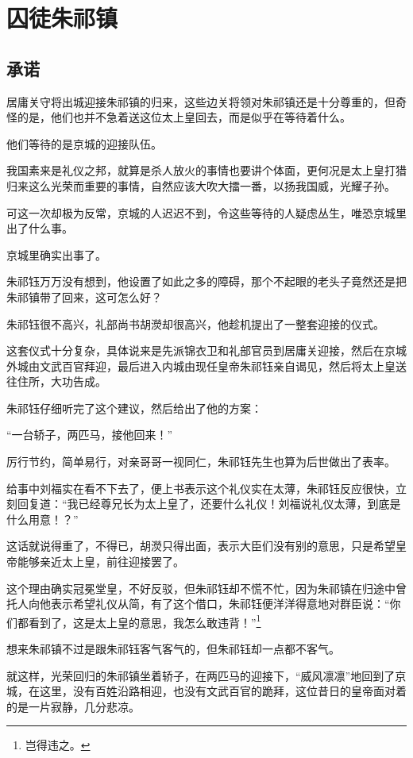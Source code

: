 \section{囚徒朱祁镇}
\ifnum{}
	\begin{multicols}{\theparacolNo}
\fi
\subsection{承诺}
居庸关守将出城迎接朱祁镇的归来，这些边关将领对朱祁镇还是十分尊重的，但奇怪的是，他们也并不急着送这位太上皇回去，而是似乎在等待着什么。

他们等待的是京城的迎接队伍。

我国素来是礼仪之邦，就算是杀人放火的事情也要讲个体面，更何况是太上皇打猎归来这么光荣而重要的事情，自然应该大吹大擂一番，以扬我国威，光耀子孙。

可这一次却极为反常，京城的人迟迟不到，令这些等待的人疑虑丛生，唯恐京城里出了什么事。

京城里确实出事了。

朱祁钰万万没有想到，他设置了如此之多的障碍，那个不起眼的老头子竟然还是把朱祁镇带了回来，这可怎么好？

朱祁钰很不高兴，礼部尚书胡濙却很高兴，他趁机提出了一整套迎接的仪式。

这套仪式十分复杂，具体说来是先派锦衣卫和礼部官员到居庸关迎接，然后在京城外城由文武百官拜迎，最后进入内城由现任皇帝朱祁钰亲自谒见，然后将太上皇送往住所，大功告成。

朱祁钰仔细听完了这个建议，然后给出了他的方案：

“一台轿子，两匹马，接他回来！”

厉行节约，简单易行，对亲哥哥一视同仁，朱祁钰先生也算为后世做出了表率。

给事中刘福实在看不下去了，便上书表示这个礼仪实在太薄，朱祁钰反应很快，立刻回复道：“我已经尊兄长为太上皇了，还要什么礼仪！刘福说礼仪太薄，到底是什么用意！？”

这话就说得重了，不得已，胡濙只得出面，表示大臣们没有别的意思，只是希望皇帝能够亲近太上皇，前往迎接罢了。

这个理由确实冠冕堂皇，不好反驳，但朱祁钰却不慌不忙，因为朱祁镇在归途中曾托人向他表示希望礼仪从简，有了这个借口，朱祁钰便洋洋得意地对群臣说：“你们都看到了，这是太上皇的意思，我怎么敢违背！”\footnote{岂得违之。}

想来朱祁镇不过是跟朱祁钰客气客气的，但朱祁钰却一点都不客气。

就这样，光荣回归的朱祁镇坐着轿子，在两匹马的迎接下，“威风凛凛”地回到了京城，在这里，没有百姓沿路相迎，也没有文武百官的跪拜，这位昔日的皇帝面对着的是一片寂静，几分悲凉。


\end{multicols}
